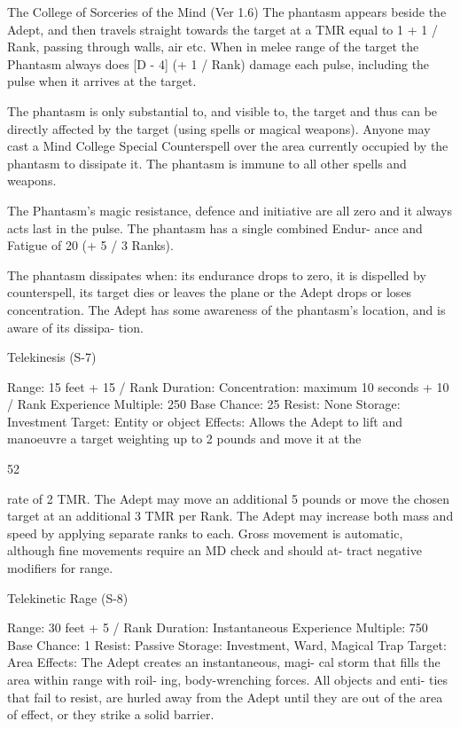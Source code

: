 \begin{Chapter}{The College of Sorceries of the Mind (Ver 1.6)}
The  phantasm  appears  beside  the  Adept,  and  then 
travels  straight  towards  the  target  at  a  TMR  equal 
to  1  +  1  /  Rank,  passing  through  walls,  air  etc. 
When  in  melee  range  of  the  target  the  Phantasm 
always  does  [D  -  4]  (+  1  /  Rank)  damage  each 
pulse,  including  the  pulse  when  it  arrives  at  the 
target. 

The phantasm is only substantial to, and visible to, 
the  target  and  thus  can  be  directly  affected  by  the 
target  (using  spells  or  magical  weapons).  Anyone 
may cast a Mind College Special Counterspell over 
the  area  currently  occupied  by  the  phantasm  to 
dissipate  it.  The  phantasm  is  immune  to  all  other 
spells and weapons. 

The  Phantasm’s  magic  resistance,  defence  and 
initiative  are  all  zero  and  it  always  acts  last in the 
pulse. The phantasm has a single combined Endur-
ance and Fatigue of 20 (+ 5 / 3 Ranks). 

The phantasm dissipates when: its endurance drops 
to  zero,  it  is  dispelled  by  counterspell,  its  target 
dies or leaves the plane or the Adept drops or loses 
concentration.  The  Adept  has  some  awareness  of 
the phantasm’s location, and is aware of its dissipa-
tion. 

Telekinesis (S-7) 

Range: 15 feet + 15 / Rank 
Duration:  Concentration:  maximum  10  seconds  + 
10 / Rank 
Experience Multiple: 250 
Base Chance: 25%
Resist: None 
Storage: Investment 
Target: Entity or object 
Effects:  Allows  the  Adept  to  lift  and  manoeuvre  a 
target weighting up to 2 pounds and move it at the 

52 

rate of 2 TMR. The Adept may move an additional 
5 pounds or move the chosen target at an additional 
3  TMR  per  Rank.  The  Adept  may  increase  both 
mass and speed by applying separate ranks to each. 
Gross  movement 
is  automatic,  although  fine 
movements  require  an  MD  check  and  should  at-
tract negative modifiers for range. 

Telekinetic Rage (S-8) 

Range: 30 feet + 5 / Rank 
Duration: Instantaneous 
Experience Multiple: 750 
Base Chance: 1%
Resist: Passive 
Storage: Investment, Ward, Magical Trap 
Target: Area 
Effects: The Adept creates an instantaneous, magi-
cal storm that fills the area  within range  with roil-
ing,  body-wrenching  forces.  All  objects  and  enti-
ties  that  fail  to  resist,  are  hurled  away  from  the 
Adept  until  they  are  out  of  the  area  of  effect,  or 
they strike a solid barrier. 


\end{Chapter}
